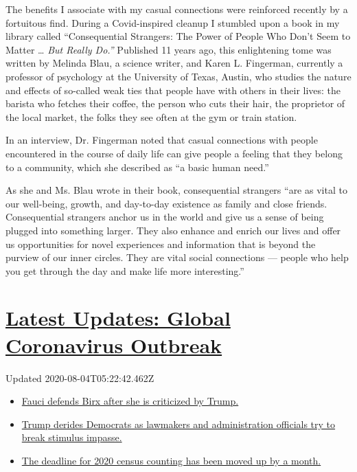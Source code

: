 The benefits I associate with my casual connections were reinforced
recently by a fortuitous find. During a Covid-inspired cleanup I
stumbled upon a book in my library called ``Consequential Strangers: The
Power of People Who Don't Seem to Matter \ldots{} \emph{But Really
Do.''} Published 11 years ago, this enlightening tome was written by
Melinda Blau, a science writer, and Karen L. Fingerman, currently a
professor of psychology at the University of Texas, Austin, who studies
the nature and effects of so-called weak ties that people have with
others in their lives: the barista who fetches their coffee, the person
who cuts their hair, the proprietor of the local market, the folks they
see often at the gym or train station.

In an interview, Dr. Fingerman noted that casual connections with people
encountered in the course of daily life can give people a feeling that
they belong to a community, which she described as ``a basic human
need.''

As she and Ms. Blau wrote in their book, consequential strangers ``are
as vital to our well-being, growth, and day-to-day existence as family
and close friends. Consequential strangers anchor us in the world and
give us a sense of being plugged into something larger. They also
enhance and enrich our lives and offer us opportunities for novel
experiences and information that is beyond the purview of our inner
circles. They are vital social connections --- people who help you get
through the day and make life more interesting.''

\hypertarget{latest-updates-global-coronavirus-outbreak}{%
\section{\texorpdfstring{\href{https://www.nytimes.com/2020/08/03/world/coronavirus-covid-19.html?action=click\&pgtype=Article\&state=default\&region=MAIN_CONTENT_1\&context=storylines_live_updates}{Latest
Updates: Global Coronavirus
Outbreak}}{Latest Updates: Global Coronavirus Outbreak}}\label{latest-updates-global-coronavirus-outbreak}}

Updated 2020-08-04T05:22:42.462Z

\begin{itemize}
\tightlist
\item
  \href{https://www.nytimes.com/2020/08/03/world/coronavirus-covid-19.html?action=click\&pgtype=Article\&state=default\&region=MAIN_CONTENT_1\&context=storylines_live_updates\#link-4547638f}{Fauci
  defends Birx after she is criticized by Trump.}
\item
  \href{https://www.nytimes.com/2020/08/03/world/coronavirus-covid-19.html?action=click\&pgtype=Article\&state=default\&region=MAIN_CONTENT_1\&context=storylines_live_updates\#link-15e7f995}{Trump
  derides Democrats as lawmakers and administration officials try to
  break stimulus impasse.}
\item
  \href{https://www.nytimes.com/2020/08/03/world/coronavirus-covid-19.html?action=click\&pgtype=Article\&state=default\&region=MAIN_CONTENT_1\&context=storylines_live_updates\#link-e5a2cda}{The
  deadline for 2020 census counting has been moved up by a month.}
\end{itemize}

